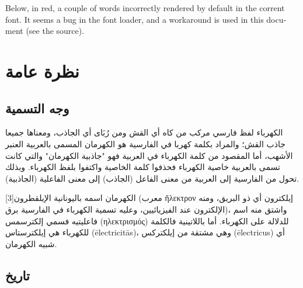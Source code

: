 \documentclass[a4paper]{book}
\begin{document}
\bigskip

\foreignlanguage*{english}{Below, in red, a couple of words
incorrectly rendered by default in the corrent font. It seems a bug in
the font loader, and a workaround is used in this document (see the
source).}

\mainmatter

\chapter{نظرة عامة}

\section{وجه التسمية}

الكهرباء لفظ فارسي مركب من کاه أي القش ومن رُبَای أي الجاذب، ومعناها
جميعا جاذب القش؛ والمراد بكلمة کهربا في الفارسية هو الكهرمان المسمى
بالعربية العنبر الأشهب، أما المقصود من كلمة الكهرباء في العربية فهو
"جاذبية الكهرمان" والتي كانت تسمى بالعربية خاصية الكهرباء فحذفوا كلمة
الخاصية واكتفوا بلفظ الكهرباء. وبذلك تحول من الفارسية إلى العربية من
معنى الفاعل (الجاذب) إلى معنى الفاعلية (الجاذبية).

الكهرمان اسمه باليونانية الإيلقطرون[3] (معرب ἤλεκτρον إيلكترون أي ذو
البريق، ومنه الإلكترون عند الفيزيائيين، وعليه تسمية الكهرباء في
الفارسية برق)، واشتق منه اسم فاعليتيه فسمي إلكترسمس (ηλεκτρ‌ισμός)
للدلالة على الكهرباء. أما باللاتينية فالكلمة للكهرباء هي إيلكترستاس
(ēlectricitās)، وهي مشتقة من إيلكتركس (ēlectricus) أي شبيه الكهرمان.

\section{تاريخ}
\end{document}
